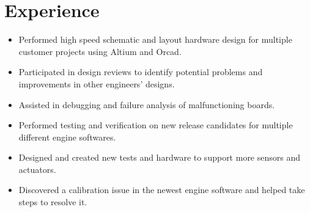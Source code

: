 \documentclass[]{deedy-resume-openfont}
\begin{document}
\begin{minipage}[t]{0.66\textwidth} 


\section{Experience}


\begin{itemize}
    \setlength\itemsep{0pt}
    \item Performed high speed schematic and layout hardware design for multiple customer projects using Altium and Orcad.    
    \item Participated in design reviews to identify potential problems and improvements in other engineers' designs.
    \item Assisted in debugging and failure analysis of malfunctioning boards. 
\end{itemize}


\begin{itemize}
    \setlength\itemsep{0pt}
    \item Performed testing and verification on new release candidates for multiple different engine softwares.
    \item Designed and created new tests and hardware to support more sensors and actuators.
    \item Discovered a calibration issue in the newest engine software and helped take steps to resolve it. 
\end{itemize}




\end{minipage}
\end{document}
